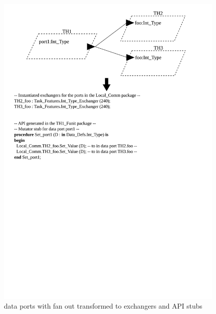 \begin{figure}
\centering
\includegraphics[scale=0.5]{figs/dataports_fanout}
\caption{\aadl data ports with fan out transformed to exchangers and
  API stubs}
\label{fig:dataports_fanout}
\end{figure}

